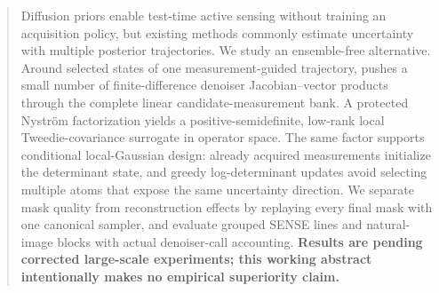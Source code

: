 \begin{abstract}
Diffusion priors enable test-time active sensing without training an
acquisition policy, but existing methods commonly estimate uncertainty with
multiple posterior trajectories.  We study an ensemble-free alternative.
Around selected states of one measurement-guided trajectory, \method{} pushes
a small number of finite-difference denoiser Jacobian--vector products through
the complete linear candidate-measurement bank.  A protected Nystr\"om
factorization yields a positive-semidefinite, low-rank local
Tweedie-covariance surrogate in operator space.  The same factor supports
conditional local-Gaussian design: already acquired measurements initialize
the determinant state, and greedy log-determinant updates avoid selecting
multiple atoms that expose the same uncertainty direction.  We separate
mask quality from reconstruction effects by replaying every final mask with
one canonical sampler, and evaluate grouped SENSE lines and natural-image
blocks with actual denoiser-call accounting.  \textbf{Results are pending
corrected large-scale experiments; this working abstract intentionally makes
no empirical superiority claim.}
\end{abstract}
